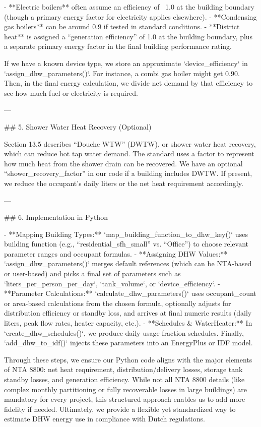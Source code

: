 - **Electric boilers** often assume an efficiency of ~1.0 at the building boundary (though a primary energy factor for electricity applies elsewhere).  
- **Condensing gas boilers** can be around 0.9 if tested in standard conditions.  
- **District heat** is assigned a “generation efficiency” of 1.0 at the building boundary, plus a separate primary energy factor in the final building performance rating.

If we have a known device type, we store an approximate `device_efficiency` in `assign_dhw_parameters()`. For instance, a combi gas boiler might get 0.90. Then, in the final energy calculation, we divide net demand by that efficiency to see how much fuel or electricity is required.

---

## 5. Shower Water Heat Recovery (Optional)

Section 13.5 describes “Douche WTW” (DWTW), or shower water heat recovery, which can reduce hot tap water demand. The standard uses a factor to represent how much heat from the shower drain can be recovered. We have an optional “shower_recovery_factor” in our code if a building includes DWTW. If present, we reduce the occupant’s daily liters or the net heat requirement accordingly.

---

## 6. Implementation in Python

- **Mapping Building Types:** `map_building_function_to_dhw_key()` uses building function (e.g., “residential_sfh_small” vs. “Office”) to choose relevant parameter ranges and occupant formulas.  
- **Assigning DHW Values:** `assign_dhw_parameters()` merges default references (which can be NTA-based or user-based) and picks a final set of parameters such as `liters_per_person_per_day`, `tank_volume`, or `device_efficiency`.  
- **Parameter Calculations:** `calculate_dhw_parameters()` uses occupant_count or area-based calculations from the chosen formula, optionally adjusts for distribution efficiency or standby loss, and arrives at final numeric results (daily liters, peak flow rates, heater capacity, etc.).  
- **Schedules & WaterHeater:** In `create_dhw_schedules()`, we produce daily usage fraction schedules. Finally, `add_dhw_to_idf()` injects these parameters into an EnergyPlus or IDF model.

Through these steps, we ensure our Python code aligns with the major elements of NTA 8800: net heat requirement, distribution/delivery losses, storage tank standby losses, and generation efficiency. While not all NTA 8800 details (like complex monthly partitioning or fully recoverable losses in large buildings) are mandatory for every project, this structured approach enables us to add more fidelity if needed. Ultimately, we provide a flexible yet standardized way to estimate DHW energy use in compliance with Dutch regulations.





